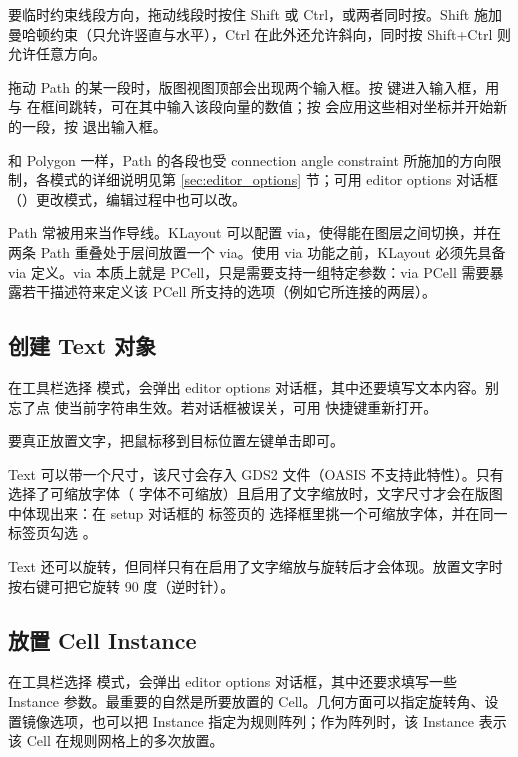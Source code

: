 要临时约束线段方向，拖动线段时按住 Shift 或 Ctrl，或两者同时按。Shift 施加曼哈顿约束（只允许竖直与水平），Ctrl 在此外还允许斜向，同时按 Shift+Ctrl 则允许任意方向。

拖动 Path 的某一段时，版图视图顶部会出现两个输入框。按  键进入输入框，用  与  在框间跳转，可在其中输入该段向量的数值；按  会应用这些相对坐标并开始新的一段，按  退出输入框。

和 Polygon 一样，Path 的各段也受 connection angle constraint 所施加的方向限制，各模式的详细说明见第 \ref{sec:editor_options} 节；可用 editor options 对话框（）更改模式，编辑过程中也可以改。

Path 常被用来当作导线。KLayout 可以配置 via，使得能在图层之间切换，并在两条 Path 重叠处于层间放置一个 via。使用 via 功能之前，KLayout 必须先具备 via 定义。via 本质上就是 PCell，只是需要支持一组特定参数：via PCell 需要暴露若干描述符来定义该 PCell 所支持的选项（例如它所连接的两层）。

\subsection{创建 Text 对象}\label{sec:create_text}

在工具栏选择  模式，会弹出 editor options 对话框，其中还要填写文本内容。别忘了点  使当前字符串生效。若对话框被误关，可用  快捷键重新打开。

要真正放置文字，把鼠标移到目标位置左键单击即可。

Text 可以带一个尺寸，该尺寸会存入 GDS2 文件（OASIS 不支持此特性）。只有选择了可缩放字体（ 字体不可缩放）且启用了文字缩放时，文字尺寸才会在版图中体现出来：在 setup 对话框的  标签页的  选择框里挑一个可缩放字体，并在同一标签页勾选 。

Text 还可以旋转，但同样只有在启用了文字缩放与旋转后才会体现。放置文字时按右键可把它旋转 90 度（逆时针）。

\subsection{放置 Cell Instance}\label{sec:create_instance}

在工具栏选择  模式，会弹出 editor options 对话框，其中还要求填写一些 Instance 参数。最重要的自然是所要放置的 Cell。几何方面可以指定旋转角、设置镜像选项，也可以把 Instance 指定为规则阵列；作为阵列时，该 Instance 表示该 Cell 在规则网格上的多次放置。

